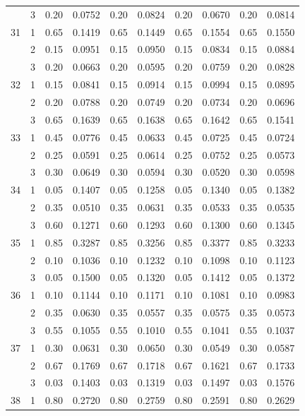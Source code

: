 \begin{longtable}{llcccccccc}
   & 3 & 0.20 & 0.0752 & 0.20 & 0.0824 & 0.20 & 0.0670 & 0.20 & 0.0814 \\ 
  31 & 1 & 0.65 & 0.1419 & 0.65 & 0.1449 & 0.65 & 0.1554 & 0.65 & 0.1550 \\ 
   & 2 & 0.15 & 0.0951 & 0.15 & 0.0950 & 0.15 & 0.0834 & 0.15 & 0.0884 \\ 
   & 3 & 0.20 & 0.0663 & 0.20 & 0.0595 & 0.20 & 0.0759 & 0.20 & 0.0828 \\ 
  32 & 1 & 0.15 & 0.0841 & 0.15 & 0.0914 & 0.15 & 0.0994 & 0.15 & 0.0895 \\ 
   & 2 & 0.20 & 0.0788 & 0.20 & 0.0749 & 0.20 & 0.0734 & 0.20 & 0.0696 \\ 
   & 3 & 0.65 & 0.1639 & 0.65 & 0.1638 & 0.65 & 0.1642 & 0.65 & 0.1541 \\ 
  33 & 1 & 0.45 & 0.0776 & 0.45 & 0.0633 & 0.45 & 0.0725 & 0.45 & 0.0724 \\ 
   & 2 & 0.25 & 0.0591 & 0.25 & 0.0614 & 0.25 & 0.0752 & 0.25 & 0.0573 \\ 
   & 3 & 0.30 & 0.0649 & 0.30 & 0.0594 & 0.30 & 0.0520 & 0.30 & 0.0598 \\ 
  34 & 1 & 0.05 & 0.1407 & 0.05 & 0.1258 & 0.05 & 0.1340 & 0.05 & 0.1382 \\ 
   & 2 & 0.35 & 0.0510 & 0.35 & 0.0631 & 0.35 & 0.0533 & 0.35 & 0.0535 \\ 
   & 3 & 0.60 & 0.1271 & 0.60 & 0.1293 & 0.60 & 0.1300 & 0.60 & 0.1345 \\ 
  35 & 1 & 0.85 & 0.3287 & 0.85 & 0.3256 & 0.85 & 0.3377 & 0.85 & 0.3233 \\ 
   & 2 & 0.10 & 0.1036 & 0.10 & 0.1232 & 0.10 & 0.1098 & 0.10 & 0.1123 \\ 
   & 3 & 0.05 & 0.1500 & 0.05 & 0.1320 & 0.05 & 0.1412 & 0.05 & 0.1372 \\ 
  36 & 1 & 0.10 & 0.1144 & 0.10 & 0.1171 & 0.10 & 0.1081 & 0.10 & 0.0983 \\ 
   & 2 & 0.35 & 0.0630 & 0.35 & 0.0557 & 0.35 & 0.0575 & 0.35 & 0.0573 \\ 
   & 3 & 0.55 & 0.1055 & 0.55 & 0.1010 & 0.55 & 0.1041 & 0.55 & 0.1037 \\ 
  37 & 1 & 0.30 & 0.0631 & 0.30 & 0.0650 & 0.30 & 0.0549 & 0.30 & 0.0587 \\ 
   & 2 & 0.67 & 0.1769 & 0.67 & 0.1718 & 0.67 & 0.1621 & 0.67 & 0.1733 \\ 
   & 3 & 0.03 & 0.1403 & 0.03 & 0.1319 & 0.03 & 0.1497 & 0.03 & 0.1576 \\ 
  38 & 1 & 0.80 & 0.2720 & 0.80 & 0.2759 & 0.80 & 0.2591 & 0.80 & 0.2629 \\ 

\end{longtable}
